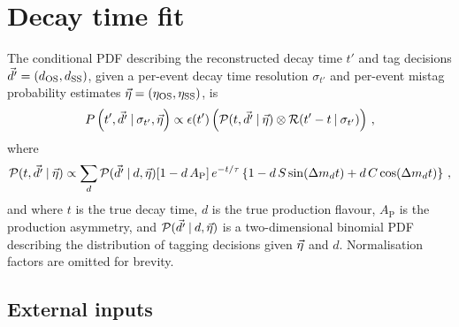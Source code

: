 
\section{Decay time fit}
\label{sec:b02dd:decaytimefit}

The conditional PDF describing the reconstructed decay time $t'$ and tag
decisions $\vec{d'} = (d_{\text{OS}}, d_{\text{SS}})$, given a per-event decay time resolution
$\sigma_{t'}$ and per-event mistag probability estimates $\vec{\eta} = (\eta_{\text{OS}},
\eta_{\text{SS}})$, is
%
\begin{equation}\label{eq:fullpdf}
  P\left(t',\vec{d'}\:\vert\: \sigma_{t'},\vec{\eta}\right)
  \propto \epsilon(t') \left(\mathcal{P}(t,\vec{d'}\:\vert\: \vec{\eta})
    \otimes \mathcal{R}(t'-t\:\vert\: \sigma_{t'})\right)\,,
\end{equation}
%
where
\begin{equation}
  \mathcal{P}(t,\vec{d'}\:\vert\: \vec{\eta}) \\
  \propto \sum_{d} \mathcal{P}(\vec{d'} \:\vert\: d,\vec{\eta})
      [1 - d\, A_\text{P}] \,
      e^{-t/\tau}\left\{1 - d\, S \sin({\Delta m_{{d}}} t) + d\, C \cos({\Delta m_{{d}}} t)\right\}\,,
\end{equation}
and where $t$ is the true decay time, $d$ is the true production flavour,
$A_\text{P}$ is the production asymmetry, and $\mathcal{P}(\vec{d'} \:\vert\:
d,\vec{\eta})$ is a two-dimensional binomial PDF describing the distribution
of tagging decisions given $\vec{\eta}$ and $d$. Normalisation factors are omitted for brevity.



\FloatBarrier


\FloatBarrier
\subsection{External inputs}
\label{sec:b02dd:decaytimefit:constraints}

